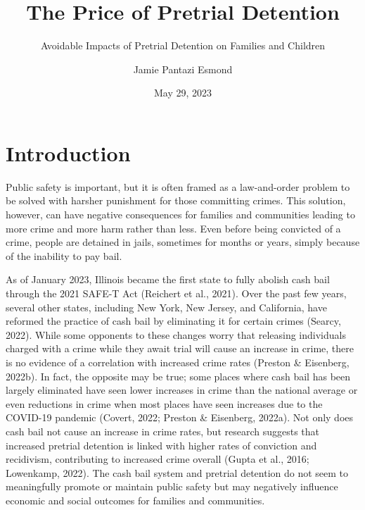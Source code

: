 \documentclass[
  letterpaper,
  DIV=11,
  numbers=noendperiod]{scrartcl}
\title{The Price of Pretrial Detention}
\subtitle{Avoidable Impacts of Pretrial Detention on Families and
Children}
\author{Jamie Pantazi Esmond}
\date{May 29, 2023}
\renewcommand*\contentsname{Table of contents}
\newcommand\contentsname{Table of contents}
\begin{document}
\maketitle
\ifdefined\Shaded\renewenvironment{Shaded}{\begin{tcolorbox}[boxrule=0pt, sharp corners, interior hidden, breakable, borderline west={3pt}{0pt}{shadecolor}, frame hidden, enhanced]}{\end{tcolorbox}}\fi

\renewcommand*\contentsname{Table of contents}
{
\hypersetup{linkcolor=}
\setcounter{tocdepth}{3}
\tableofcontents
}
\listoffigures
\newpage

\hypertarget{introduction}{%
\section{Introduction}\label{introduction}}

Public safety is important, but it is often framed as a law-and-order
problem to be solved with harsher punishment for those committing
crimes. This solution, however, can have negative consequences for
families and communities leading to more crime and more harm rather than
less. Even before being convicted of a crime, people are detained in
jails, sometimes for months or years, simply because of the inability to
pay bail.

As of January 2023, Illinois became the first state to fully abolish
cash bail through the 2021 SAFE-T Act (Reichert et al., 2021). Over the
past few years, several other states, including New York, New Jersey,
and California, have reformed the practice of cash bail by eliminating
it for certain crimes (Searcy, 2022). While some opponents to these
changes worry that releasing individuals charged with a crime while they
await trial will cause an increase in crime, there is no evidence of a
correlation with increased crime rates (Preston \& Eisenberg, 2022b). In
fact, the opposite may be true; some places where cash bail has been
largely eliminated have seen lower increases in crime than the national
average or even reductions in crime when most places have seen increases
due to the COVID-19 pandemic (Covert, 2022; Preston \& Eisenberg,
2022a). Not only does cash bail not cause an increase in crime rates,
but research suggests that increased pretrial detention is linked with
higher rates of conviction and recidivism, contributing to increased
crime overall (Gupta et al., 2016; Lowenkamp, 2022). The cash bail
system and pretrial detention do not seem to meaningfully promote or
maintain public safety but may negatively influence economic and social
outcomes for families and communities.
\end{document}
